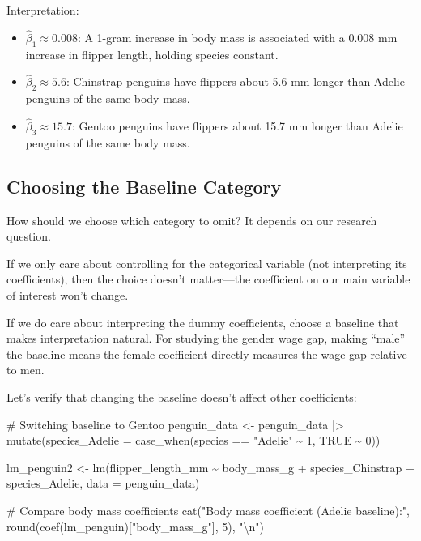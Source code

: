 \documentclass[
  letterpaper,
  DIV=11,
  numbers=noendperiod]{scrreprt}
\newenvironment{Shaded}{\begin{snugshade}}{\end{snugshade}}
\newcommand{\AttributeTok}[1]{\textcolor[rgb]{0.40,0.45,0.13}{#1}}
\newcommand{\CommentTok}[1]{\textcolor[rgb]{0.37,0.37,0.37}{#1}}
\newcommand{\ConstantTok}[1]{\textcolor[rgb]{0.56,0.35,0.01}{#1}}
\newcommand{\DecValTok}[1]{\textcolor[rgb]{0.68,0.00,0.00}{#1}}
\newcommand{\FunctionTok}[1]{\textcolor[rgb]{0.28,0.35,0.67}{#1}}
\newcommand{\NormalTok}[1]{\textcolor[rgb]{0.00,0.23,0.31}{#1}}
\newcommand{\OtherTok}[1]{\textcolor[rgb]{0.00,0.23,0.31}{#1}}
\newcommand{\SpecialCharTok}[1]{\textcolor[rgb]{0.37,0.37,0.37}{#1}}
\newcommand{\StringTok}[1]{\textcolor[rgb]{0.13,0.47,0.30}{#1}}
\providecommand{\tightlist}{%
  \setlength{\itemsep}{0pt}\setlength{\parskip}{0pt}}
\begin{document}
Interpretation:

\begin{itemize}
\tightlist
\item
  \(\hat{\beta}_1 \approx 0.008\): A 1-gram increase in body mass is
  associated with a 0.008 mm increase in flipper length, holding species
  constant.
\item
  \(\hat{\beta}_2 \approx 5.6\): Chinstrap penguins have flippers about
  5.6 mm longer than Adelie penguins of the same body mass.
\item
  \(\hat{\beta}_3 \approx 15.7\): Gentoo penguins have flippers about
  15.7 mm longer than Adelie penguins of the same body mass.
\end{itemize}

\subsection{Choosing the Baseline
Category}\label{choosing-the-baseline-category}

How should we choose which category to omit? It depends on our research
question.

If we only care about controlling for the categorical variable (not
interpreting its coefficients), then the choice doesn't matter---the
coefficient on our main variable of interest won't change.

If we do care about interpreting the dummy coefficients, choose a
baseline that makes interpretation natural. For studying the gender wage
gap, making ``male'' the baseline means the female coefficient directly
measures the wage gap relative to men.

Let's verify that changing the baseline doesn't affect other
coefficients:

\begin{Shaded}
\begin{Highlighting}[]
\CommentTok{\# Switching baseline to Gentoo}
\NormalTok{penguin\_data }\OtherTok{\textless{}{-}}\NormalTok{ penguin\_data }\SpecialCharTok{|\textgreater{}} 
    \FunctionTok{mutate}\NormalTok{(}\AttributeTok{species\_Adelie =} \FunctionTok{case\_when}\NormalTok{(species }\SpecialCharTok{==} \StringTok{"Adelie"} \SpecialCharTok{\textasciitilde{}} \DecValTok{1}\NormalTok{, }\ConstantTok{TRUE} \SpecialCharTok{\textasciitilde{}} \DecValTok{0}\NormalTok{))}

\NormalTok{lm\_penguin2 }\OtherTok{\textless{}{-}} \FunctionTok{lm}\NormalTok{(flipper\_length\_mm }\SpecialCharTok{\textasciitilde{}}\NormalTok{ body\_mass\_g }\SpecialCharTok{+}\NormalTok{ species\_Chinstrap }\SpecialCharTok{+}\NormalTok{ species\_Adelie, }
                  \AttributeTok{data =}\NormalTok{ penguin\_data)}

\CommentTok{\# Compare body mass coefficients}
\FunctionTok{cat}\NormalTok{(}\StringTok{"Body mass coefficient (Adelie baseline):"}\NormalTok{, }\FunctionTok{round}\NormalTok{(}\FunctionTok{coef}\NormalTok{(lm\_penguin)[}\StringTok{"body\_mass\_g"}\NormalTok{], }\DecValTok{5}\NormalTok{), }\StringTok{"}\SpecialCharTok{\textbackslash{}n}\StringTok{"}\NormalTok{)}
\end{Highlighting}
\end{Shaded}
\end{document}
